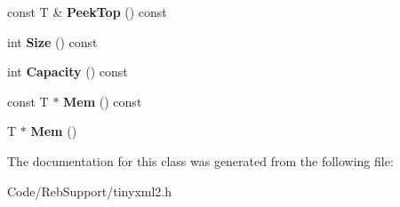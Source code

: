 \begin{DoxyCompactItemize}
\item 
const T \& {\bfseries Peek\+Top} () const \hypertarget{classtinyxml2_1_1_dyn_array_a9c2282ea8901b5a92ccaac2e6166a788}{}\label{classtinyxml2_1_1_dyn_array_a9c2282ea8901b5a92ccaac2e6166a788}

\item 
int {\bfseries Size} () const \hypertarget{classtinyxml2_1_1_dyn_array_a1299b257b62ea6b4983c488867f219b0}{}\label{classtinyxml2_1_1_dyn_array_a1299b257b62ea6b4983c488867f219b0}

\item 
int {\bfseries Capacity} () const \hypertarget{classtinyxml2_1_1_dyn_array_a8edbe90ed53b2e46b1b5cf53b261e4e7}{}\label{classtinyxml2_1_1_dyn_array_a8edbe90ed53b2e46b1b5cf53b261e4e7}

\item 
const T $\ast$ {\bfseries Mem} () const \hypertarget{classtinyxml2_1_1_dyn_array_a1f39330daeb97d3d1dc3fc12dcf7ac67}{}\label{classtinyxml2_1_1_dyn_array_a1f39330daeb97d3d1dc3fc12dcf7ac67}

\item 
T $\ast$ {\bfseries Mem} ()\hypertarget{classtinyxml2_1_1_dyn_array_a0e0d60b399d54fad5b33d5008bc59c8e}{}\label{classtinyxml2_1_1_dyn_array_a0e0d60b399d54fad5b33d5008bc59c8e}

\end{DoxyCompactItemize}


The documentation for this class was generated from the following file\+:\begin{DoxyCompactItemize}
\item 
Code/\+Reb\+Support/tinyxml2.\+h\end{DoxyCompactItemize}

